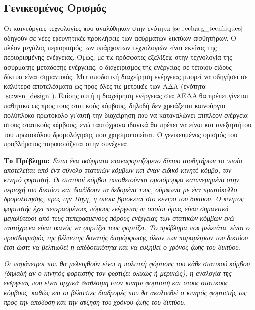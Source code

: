 \subsection{Γενικευμένος Ορισμός}
Οι καινούργιες τεχνολογίες που αναλύθηκαν στην ενότητα $\ref{sc:recharg_tecnhiques}$ οδηγούν σε νέες ερευνητικές προκλήσεις των ασύρματων δικτύων αισθητήρων. Ο πλέον
μεγάλος περιορισμός των υπάρχοντων τεχνολογιών είναι εκείνος της περιορισμένης ενέργειας. Όμως, με τις πρόσφατες εξελίξεις στην τεχνολογία της ασύρματης μετάδοσης
ενέργειας, ο διαχειρισμός της ενέργειας σε τέτοιου είδους δίκτυα είναι σημαντικός. Μια αποδοτική διαχείρηση ενέργειας μπορεί να οδηγήσει σε καλύτερα αποτελέσματα ως
προς όλες τις μετρικές των ΑΔΑ (ενότητα $\ref{sc:wsn_design}$). Επίσης αυτή η διαχείρηση ενέργειας στα ΑΕΔΑ θα πρέπει γίνεται παθητικά ως προς τους στατικούς κόμβους,
δηλαδή δεν χρειάζεται καινούργιο πολύπλοκο πρωτόκολο γι'αυτή την διαχείρηση που να καταναλώνει επιπλέον ενέργεια στους στατικούς κόμβους, ενώ ταυτόχρονα ιδανικά θα
πρέπει να είναι και ανεξαρτήτου του πρωτοκόλου δρομολόγησης που χρησιμοποιείται. Ο γενικευμένος ορισμός του προβλήματος παρουσιάζεται στην συνέχεια:

\textbf{Το Πρόβλημα:} \textit{Έστω ένα ασύρματα επαναφορτιζόμενο δίκτυο αισθητήρων το οποίο αποτελείται από ένα σύνολο στατικών κόμβων και έναν ειδικό κινητό κόμβο,
τον κινητό φορτιστή. Οι στατικοί κόμβοι τοποθετούνται ομοιόμορφα κατανεμημένα στην περιοχή του δικτύου και διαδίδουν τα δεδομένα τους, σύμφωνα με ένα πρωτόκολλο
δρομολόγησης, προς την Πηγή, η οποία βρίσκεται στο κέντρο του δικτύου. Ο κινητός φορτιστής έχει πεπερασμένους πόρους ενέργειας οι οποίοι όμως είναι σημαντικά
μεγαλύτεροι από τους πεπερασμένους πόρους ενέργειας των στατικών κόμβων ενώ ταυτόχρονα είναι ικανός να φορτίζει τους φορτίζει. Το πρόβλημα που μελετάται είναι ο
προσδιορισμός της βέλτιστης δυνατής διαμόρφωσης όλων των παραμέτρων του δικτύου έτσι ώστε να βελτιωθεί η απόδοτικότητα και να αυξηθεί ο χρόνος ζωής του δικτύου.}

\textit{Οι παράμετροι που θα μελετηθούν είναι η πολιτική φόρτισης του κάθε στατικού κόμβου (δηλαδή αν ο κινητός φορτιστής τον φορτίζει ολικώς ή μερικώς), η αναλογία
της ενέργειας που είναι αρχικά διαθέσιμη στον κινητό φορτιστή και στους στατικούς κόμβους, καθώς και οι βέλτιστες διαδρομές που θα ακολουθεί ο κινητός φορτιστής ως
προς την απόδοση και την αύξηση του χρόνου ζωής του δικτύου.}



